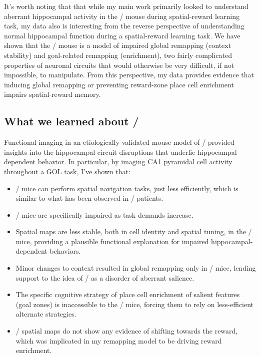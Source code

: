 It's worth noting that that while my main work primarily looked to understand aberrant hippocampal activity in the \df/ mouse during spatial-reward learning task, my data also is interesting from the reverse perspective of understanding normal hippocampal function during a spatial-reward learning task.
We have shown that the \df/ mouse is a model of impaired global remapping (context stability) and goal-related remapping (enrichment), two fairly complicated properties of neuronal circuits that would otherwise be very difficult, if not impossible, to manipulate.
From this perspective, my data provides evidence that inducing global remapping or preventing reward-zone place cell enrichment impairs spatial-reward memory.


\subsection{What we learned about \scz/}

Functional imaging in an etiologically-validated mouse model of \scz/ provided insights into the hippocampal circuit disruptions that underlie hippocampal-dependent behavior. In particular, by imaging CA1 pyramidal cell activity throughout a \ac{GOL} task, I've shown that:
\begin{itemize}
	\item \df/ mice can perform spatial navigation tasks, just less efficiently, which is similar to what has been observed in \scz/ patients.
	\item \df/ mice are specifically impaired as task demands increase.
	\item Spatial maps are less stable, both in cell identity and spatial tuning, in the \df/ mice, providing a plausible functional explanation for impaired hippocampal-dependent behaviors.
	\item Minor changes to context resulted in global remapping only in \df/ mice, lending support to the idea of \scz/ as a disorder of aberrant salience.
	\item The specific cognitive strategy of place cell enrichment of salient features (goal zones) is inaccessible to the \df/ mice, forcing them to rely on less-efficient alternate strategies.
	\item \df/ spatial maps do not show any evidence of shifting towards the reward, which was implicated in my remapping model to be driving reward enrichment.
\end{itemize}

